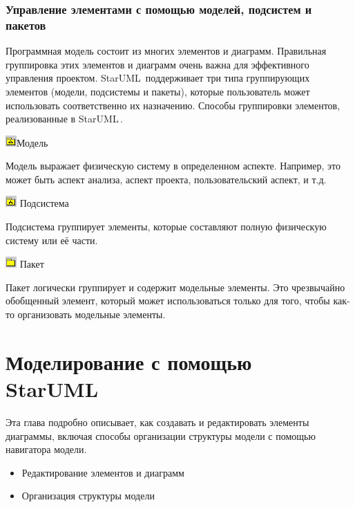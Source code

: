 \documentclass[a4paper,12pt]{report}
\newcommand{\staruml}{StarUML\,\tm}
\begin{document}
\subsection*{Управление элементами с помощью моделей, подсистем и пакетов}
Программная модель состоит из многих элементов и диаграмм. Правильная группировка этих
элементов и диаграмм очень важна для эффективного управления проектом. \staruml
поддерживает три типа группирующих элементов (модели, подсистемы и пакеты), которые
пользователь может использовать соответственно их назначению.
Способы группировки элементов, реализованные в \staruml.


\includegraphics[width=3ex]{images/folder}Модель

Модель выражает физическую систему в определенном аспекте. Например, это может быть аспект
анализа, аспект проекта, пользовательский аспект, и т.д.

\includegraphics[width=3ex]{images/subsistem}
Подсистема

Подсистема группирует элементы, которые составляют полную физическую систему или её части.

\includegraphics[width=3ex]{images/package}
Пакет

Пакет логически группирует и содержит модельные элементы. Это чрезвычайно обобщенный
элемент, который может использоваться только для того, чтобы как-то организовать модельные
элементы.

\chapter{Моделирование с помощью \staruml}
Эта глава подробно описывает, как создавать и редактировать элементы диаграммы, включая
способы организации структуры модели с помощью навигатора модели.
\begin{itemize}
	\item Редактирование элементов и диаграмм
	\item Организация структуры модели
\end{itemize}
\end{document}

